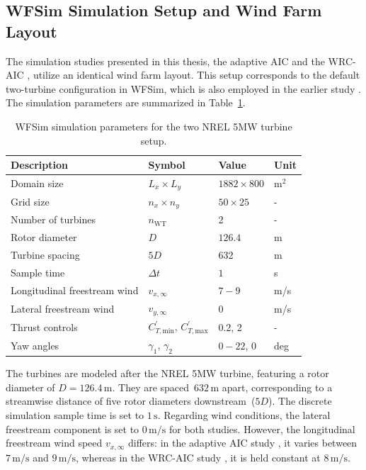 \subsection{WFSim Simulation Setup and Wind Farm Layout}
The simulation studies presented in this thesis, the adaptive AIC \cite{dittmer2022data} and the WRC-AIC \cite{dittmer2023koopman}, utilize an identical wind farm layout. This setup corresponds to the default two-turbine configuration in WFSim, which is also employed in the earlier study \cite{sharan2022Koopman}. The simulation parameters are summarized in Table~\ref{table:WfSim}. 
%
\begin{table}[ht]
    \centering
    \caption{WFSim simulation parameters for the two NREL 5MW turbine setup.}
    \label{table:WfSim}
    \begin{tabular}{l l l l} 
        \toprule
        Description & Symbol & Value & Unit\\
        \midrule
        Domain size &$L_x\times L_y$ & $1882\times 800$& $\text{m}^2$ \\
        Grid size  &$n_x\times n_y$ & $50\times 25$ & -\\
        Number of turbines& $n_{\text{WT}}$ & 2 & - \\
        Rotor diameter & $D$  & $126.4$& m \\
        Turbine spacing & $5D$ & 632 & m\\
        Sample time &$\Delta t$ & $1$ & s \\
        Longitudinal freestream wind &$v_{x,\infty}$&  $7 - 9$ & m/s \\
        Lateral freestream wind &$v_{y,\infty}$  & $0$ & m/s \\         
        Thrust controls & $C^{\prime}_{T,\text{min}}$, $C^{\prime}_{T,\text{max}}$ & 0.2, 2 & -\\
        Yaw angles &$\gamma_1$, $\gamma_2$ &  $0 - 22$, $0$ & deg\\
        \bottomrule
    \end{tabular}
\end{table}
%
The turbines are modeled after the NREL 5MW turbine, featuring a rotor diameter of $D = 126.4\,\text{m}$. They are spaced~$632\,\text{m}$ apart, corresponding to a streamwise distance of five rotor diameters downstream~($5D$). The discrete simulation sample time is set to $1\,\text{s}$. Regarding wind conditions, the lateral freestream component is set to $0\,\text{m/s}$ for both studies. However, the longitudinal freestream wind speed $v_{x,\infty}$ differs: in the adaptive AIC study \cite{dittmer2022data}, it varies between $7\,\text{m/s}$ and $9\,\text{m/s}$, whereas in the WRC-AIC study \cite{dittmer2023koopman}, it is held constant at $8\,\text{m/s}$.

